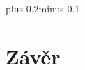 \documentclass[11pt,twoside,a4paper]{book}
\begin{document}

\tableofcontents



\listoffigures






\mainbodystarts
\normalfont
{}\baselineskip plus 0.2\baselineskip minus 0.1\baselineskip





















\chapter{Závěr}

\end{document}
